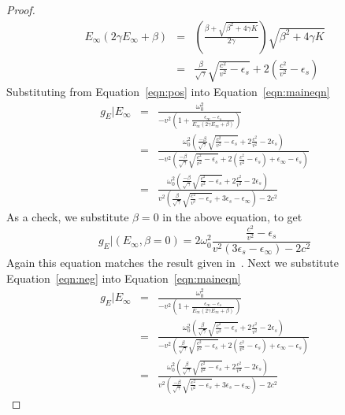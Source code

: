 \documentclass{article}[12pt]
\theoremstyle{plain}
\begin{document}
\begin{proof}
\begin{eqnarray}
E_\infty ( 2\gamma E_\infty + \beta ) & = & (\frac{\beta + \sqrt{\beta^2 + 4\gamma K}}{2\gamma})\sqrt{\beta^2 + 4\gamma K} \\
& = & \frac{\beta}{\sqrt{\gamma}}\sqrt{\frac{c^2}{v^2}-\epsilon_s} + 2(\frac{c^2}{v^2}-\epsilon_s) \label{eqn:neg}
\end{eqnarray}
Substituting from Equation~\ref{eqn:pos} into Equation~\ref{eqn:maineqn}
\begin{eqnarray}
g_E|E_\infty & = & \frac{\omega_0^2}
{-v^2(1+\frac{\epsilon_\infty - \epsilon_s}{E_\infty(2\gamma E_\infty + \beta)})} \\
& = & \frac{\omega_0^2 (\frac{-\beta}{\sqrt{\gamma}}\sqrt{\frac{c^2}{v^2}-\epsilon_s} + 2\frac{c^2}{v^2} - 2\epsilon_s)}
{-v^2(\frac{-\beta}{\sqrt{\gamma}}\sqrt{\frac{c^2}{v^2}-\epsilon_s} + 2(\frac{c^2}{v^2} - \epsilon_s) + \epsilon_\infty - \epsilon_s)} \\
& = & \frac{\omega_0^2 (\frac{-\beta}{\sqrt{\gamma}}\sqrt{\frac{c^2}{v^2}-\epsilon_s} + 2\frac{c^2}{v^2} - 2\epsilon_s)}
{v^2(\frac{\beta}{\sqrt{\gamma}}\sqrt{\frac{c^2}{v^2}-\epsilon_s} + 3\epsilon_s - \epsilon_\infty) - 2c^2} \label{eqn:complex1}
\end{eqnarray}
As a check, we substitute $\beta=0$ in the above equation, to get
\[
g_E|(E_\infty,\beta=0) = 2\omega_0^2\frac{\frac{c^2}{v^2}-\epsilon_s}
{v^2(3 \epsilon_s - \epsilon_\infty) -2c^2} 
\]
Again this equation matches the result given in~\cite{sorensen2005kink}.
Next we substitute Equation~\ref{eqn:neg} into Equation~\ref{eqn:maineqn}
\begin{eqnarray}
g_E|E_\infty & = & \frac{\omega_0^2}
{-v^2(1+\frac{\epsilon_\infty - \epsilon_s}{E_\infty(2\gamma E_\infty + \beta)})} \\
& = & \frac{\omega_0^2 (\frac{\beta}{\sqrt{\gamma}}\sqrt{\frac{c^2}{v^2}-\epsilon_s} + 2\frac{c^2}{v^2} - 2\epsilon_s)}
{-v^2(\frac{\beta}{\sqrt{\gamma}}\sqrt{\frac{c^2}{v^2}-\epsilon_s} + 2(\frac{c^2}{v^2} - \epsilon_s) + \epsilon_\infty - \epsilon_s)} \\
& = & \frac{\omega_0^2 (\frac{\beta}{\sqrt{\gamma}}\sqrt{\frac{c^2}{v^2}-\epsilon_s} + 2\frac{c^2}{v^2} - 2\epsilon_s)}
{v^2(\frac{-\beta}{\sqrt{\gamma}}\sqrt{\frac{c^2}{v^2}-\epsilon_s} + 3\epsilon_s - \epsilon_\infty) - 2c^2} \label{eqn:real1}
\end{eqnarray}


\end{proof}
\end{document}
